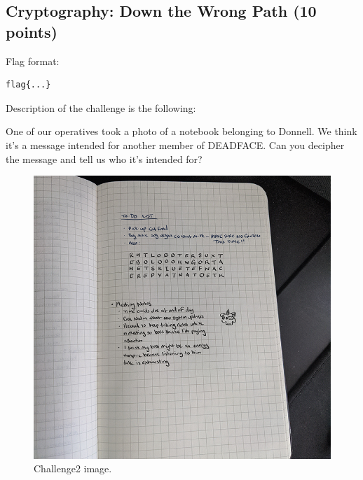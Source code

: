 \documentclass[11 pt]{article}
\begin{document}
\subsection{Cryptography: Down the Wrong Path (10 points)}
Flag format:
\begin{lstlisting}
flag{...}
\end{lstlisting}
Description of the challenge is the following:
\begin{tcolorbox}
One of our operatives took a photo of a notebook belonging to Donnell. We think it's a message intended for another member of DEADFACE. Can you decipher the message and tell us who it's intended for?
\end{tcolorbox}
\begin{figure}[H]
    \centering
    \includegraphics[height=0.55\linewidth]{challenge2.png}
    \caption{Challenge2 image.}
    \label{fig:challenge2}
\end{figure}

\end{document}

